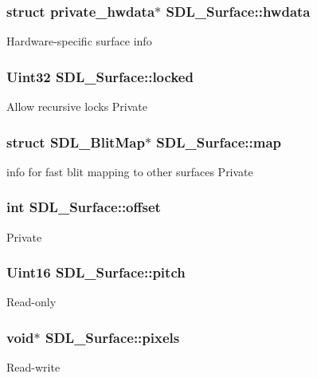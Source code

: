 \subsubsection[{hwdata}]{\setlength{\rightskip}{0pt plus 5cm}struct private\+\_\+hwdata$\ast$ S\+D\+L\+\_\+\+Surface\+::hwdata}\label{struct_s_d_l___surface_a2d3ce688b6cfb72875f2411ea0560f18}
Hardware-\/specific surface info 
\subsubsection[{locked}]{\setlength{\rightskip}{0pt plus 5cm}Uint32 S\+D\+L\+\_\+\+Surface\+::locked}\label{struct_s_d_l___surface_ae807b7e4f4174d56e6cf40df12c8cefe}
Allow recursive locks Private 
\subsubsection[{map}]{\setlength{\rightskip}{0pt plus 5cm}struct S\+D\+L\+\_\+\+Blit\+Map$\ast$ S\+D\+L\+\_\+\+Surface\+::map}\label{struct_s_d_l___surface_a8c1ecad399b0d4f525b1a53b6ee9393f}
info for fast blit mapping to other surfaces Private 
\subsubsection[{offset}]{\setlength{\rightskip}{0pt plus 5cm}int S\+D\+L\+\_\+\+Surface\+::offset}\label{struct_s_d_l___surface_ab40c060fa976dbb25bebc7869132ffda}
Private 
\subsubsection[{pitch}]{\setlength{\rightskip}{0pt plus 5cm}Uint16 S\+D\+L\+\_\+\+Surface\+::pitch}\label{struct_s_d_l___surface_a53fd25784c0f6efd7dd19bb0afce5452}
Read-\/only 
\subsubsection[{pixels}]{\setlength{\rightskip}{0pt plus 5cm}void$\ast$ S\+D\+L\+\_\+\+Surface\+::pixels}\label{struct_s_d_l___surface_abd9597e0e084b8ef33fe0397bc26d911}
Read-\/write 
